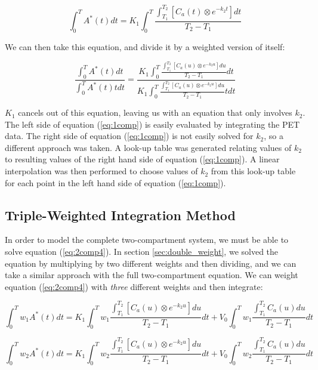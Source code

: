 \begin{equation}
\int_{0}^{T} A^{*}(t) dt = K_{1} \int_{0}^{T} \frac{\int_{T_1}^{T_2}
\left[ C_{a}(t) \otimes e^{-k_{2}t} \right] dt}{T_2 - T_1}
\end{equation}

We can then take this equation, and divide it by a weighted version
of itself:

\begin{equation}
\frac{\int_{0}^{T} A^{*}(t) dt}{\int_{0}^{T} A^{*}(t) t dt} =
\frac{K_{1} \int_{0}^{T} \frac{\int_{T_1}^{T_2} \left[ C_{a}(u)
\otimes e^{-k_{2}u} \right] du}{T_2 - T_1} dt}{K_{1} \int_{0}^{T}
\frac{\int_{T_1}^{T_2} \left[ C_{a}(u) \otimes e^{-k_{2}u} \right]
du}{T_2 - T_1} t dt}
\label{eq:1comp}
\end{equation}

$K_{1}$ cancels out of this equation, leaving us with an equation
that only involves $k_{2}$.  The left side of equation
(\ref{eq:1comp}) is easily evaluated by integrating the PET data.
The right side of equation (\ref{eq:1comp}) is not easily solved for
$k_{2}$, so a different approach was taken.  A look-up table was
generated relating values of $k_{2}$ to resulting values of the
right hand side of equation (\ref{eq:1comp}).  A linear
interpolation was then performed to choose values of $k_{2}$ from
this look-up table for each point in the left hand side of equation
(\ref{eq:1comp}).


\subsection{Triple-Weighted Integration Method}

In order to model the complete two-compartment system, we must be able
to solve equation (\ref{eq:2comp4}).  In section
\ref{sec:double_weight},
we solved the equation by multiplying by two different weights and
then dividing, and we can take a similar approach with the full
two-compartment equation.  We can weight equation (\ref{eq:2comp4})
with {\em three} different weights and then integrate:

\begin{equation}
\int_{0}^{T} w_{1}A^{*}(t)dt = K_{1} \int_{0}^{T} w_{1}
\frac{\int_{T_1}^{T_2} \left[ C_{a}(u) \otimes e^{-k_{2}u} \right]
du}{T_2 - T_1} dt + V_{0} \int_{0}^{T}w_{1} \frac{\int_{T_1}^{T_2}
C_{a}(u) du}{T_2 - T_1} dt \label{eq:fullweight1}
\end{equation}

\begin{equation}
\int_{0}^{T} w_{2}A^{*}(t)dt = K_{1} \int_{0}^{T} w_{2}
\frac{\int_{T_1}^{T_2} \left[ C_{a}(u) \otimes e^{-k_{2}u} \right]
du}{T_2 - T_1} dt + V_{0} \int_{0}^{T}w_{2} \frac{\int_{T_1}^{T_2}
C_{a}(u) du}{T_2 - T_1} dt \label{eq:fullweight2}
\end{equation}


